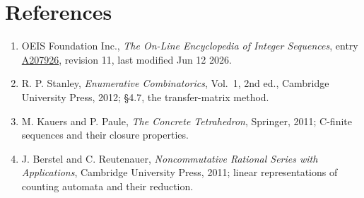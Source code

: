 \documentclass[11pt]{article}
\theoremstyle{definition}
\begin{document}
\section{References}

\begin{enumerate}

\item OEIS Foundation Inc., \emph{The On-Line Encyclopedia of Integer Sequences}, entry \href{https://oeis.org/A207926}{A207926}, revision 11, last modified Jun 12 2026.

\item R. P. Stanley, \emph{Enumerative Combinatorics}, Vol.~1, 2nd ed., Cambridge University Press, 2012; \S4.7, the transfer-matrix method.

\item M. Kauers and P. Paule, \emph{The Concrete Tetrahedron}, Springer, 2011; C-finite sequences and their closure properties.

\item J. Berstel and C. Reutenauer, \emph{Noncommutative Rational Series with Applications}, Cambridge University Press, 2011; linear representations of counting automata and their reduction.

\end{enumerate}
\end{document}
